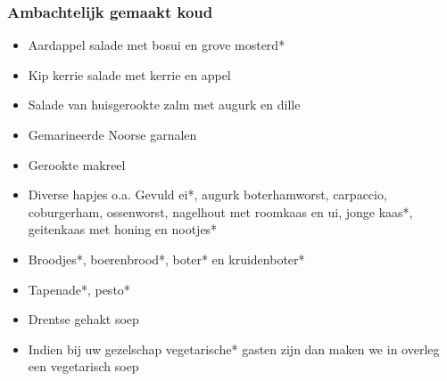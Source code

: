 \subsubsection*{Ambachtelijk gemaakt koud}
\begin{itemize}
	\item	Aardappel salade met bosui en grove mosterd*
	\item	Kip kerrie salade met kerrie en appel
	\item	Salade van huisgerookte zalm met augurk en dille
	\item	Gemarineerde Noorse garnalen
	\item	Gerookte makreel
	\item	 Diverse hapjes o.a. Gevuld ei*, augurk boterhamworst, carpaccio, coburgerham, ossenworst, nagelhout met roomkaas en ui, jonge kaas*, geitenkaas met honing en nootjes*
	\item	Broodjes*, boerenbrood*, boter* en kruidenboter*
	\item	Tapenade*, pesto*
	\item	Drentse gehakt soep
\item	Indien bij uw gezelschap vegetarische* gasten zijn dan maken we in overleg een vegetarisch soep
\end{itemize}
